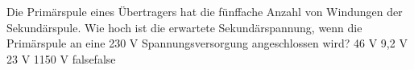     {Die Primärspule eines Übertragers hat die fünffache Anzahl von Windungen der Sekundärspule. Wie hoch ist die erwartete Sekundärspannung, wenn die Primärspule an eine 230 V Spannungsversorgung angeschlossen wird?}
    {46 V}
    {9,2 V}
    {23 V}
    {1150 V}
    {false}{false}